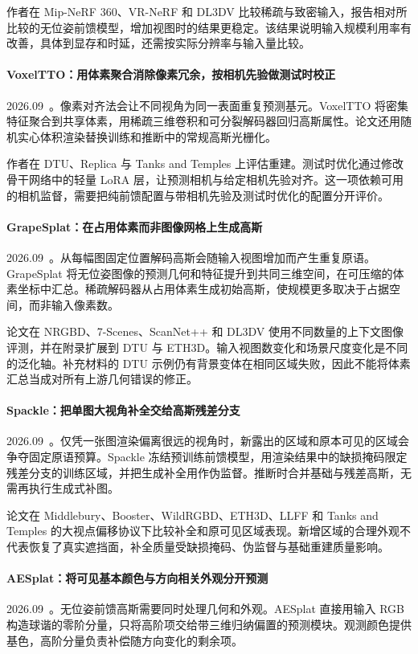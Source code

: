 作者在 Mip-NeRF 360、VR-NeRF 和 DL3DV 比较稀疏与致密输入，报告相对所比较的无位姿前馈模型，增加视图时的结果更稳定。该结果说明输入规模利用率有改善，具体到显存和时延，还需按实际分辨率与输入量比较。

\paragraph{VoxelTTO：用体素聚合消除像素冗余，按相机先验做测试时校正}
2026.09~\cite{2609_21498}。像素对齐法会让不同视角为同一表面重复预测基元。VoxelTTO 将密集特征聚合到共享体素，用稀疏三维卷积和可分裂解码器回归高斯属性。论文还用随机实心体积渲染替换训练和推断中的常规高斯光栅化。

作者在 DTU、Replica 与 Tanks and Temples 上评估重建。测试时优化通过修改骨干网络中的轻量 LoRA 层，让预测相机与给定相机先验对齐。这一项依赖可用的相机监督，需要把纯前馈配置与带相机先验及测试时优化的配置分开评价。

\paragraph{GrapeSplat：在占用体素而非图像网格上生成高斯}
2026.09~\cite{2609_23182}。从每幅图固定位置解码高斯会随输入视图增加而产生重复原语。GrapeSplat 将无位姿图像的预测几何和特征提升到共同三维空间，在可压缩的体素坐标中汇总。稀疏解码器从占用体素生成初始高斯，使规模更多取决于占据空间，而非输入像素数。

论文在 NRGBD、7-Scenes、ScanNet++ 和 DL3DV 使用不同数量的上下文图像评测，并在附录扩展到 DTU 与 ETH3D。输入视图数变化和场景尺度变化是不同的泛化轴。补充材料的 DTU 示例仍有背景变体在相同区域失败，因此不能将体素汇总当成对所有上游几何错误的修正。

\paragraph{Spackle：把单图大视角补全交给高斯残差分支}
2026.09~\cite{2609_30941}。仅凭一张图渲染偏离很远的视角时，新露出的区域和原本可见的区域会争夺固定原语预算。Spackle 冻结预训练前馈模型，用渲染结果中的缺损掩码限定残差分支的训练区域，并把生成补全用作伪监督。推断时合并基础与残差高斯，无需再执行生成式补图。

论文在 Middlebury、Booster、WildRGBD、ETH3D、LLFF 和 Tanks and Temples 的大视点偏移协议下比较补全和原可见区域表现。新增区域的合理外观不代表恢复了真实遮挡面，补全质量受缺损掩码、伪监督与基础重建质量影响。

\paragraph{AESplat：将可见基本颜色与方向相关外观分开预测}
2026.09~\cite{2609_36693}。无位姿前馈高斯需要同时处理几何和外观。AESplat 直接用输入 RGB 构造球谐的零阶分量，只将高阶项交给带三维归纳偏置的预测模块。观测颜色提供基色，高阶分量负责补偿随方向变化的剩余项。

